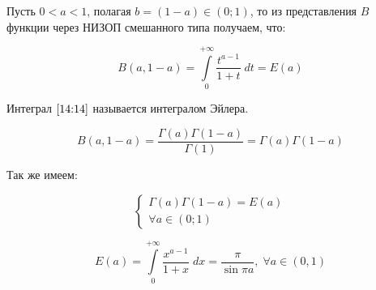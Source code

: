 \documentclass[../../main.tex]{subfiles}
\begin{document}
	Пусть $0 < a < 1$, полагая $b = (1-a) \in (0;1)$, то из представления $B$ функции через НИЗОП смешанного типа получаем, что:
	
	\begin{equation}
	\label{14:14}
	B\left( a,1-a\right) = \int\limits_{0}^{+\infty} \frac{t^{a-1}}{1+t} \; dt = E(a)
	\end{equation}
	
	Интеграл $\eqref{14:14}$ называется интегралом Эйлера.
	
	\[  B\left( a,1-a\right)  = \frac{\Gamma(a) \Gamma(1-a) }{\Gamma(1)} = \Gamma(a) \Gamma(1-a) \]
	
	Так же имеем:
	
	\begin{equation}
	\label{14:15}
	\begin{cases}
	\Gamma(a) \Gamma(1-a) = E(a)  \\
	\forall a \in (0;1)
	\end{cases}
	\end{equation}
	
	\begin{thm}
		\begin{equation}
		\label{14:16}
		E(a) = \int\limits_{0}^{+\infty} \frac{x^{a-1}}{1+x} \; dx = \frac{\pi}{\sin{\pi a}}, \; \forall a \in(0,1)
		\end{equation}
		
	\end{thm}
\end{document}
